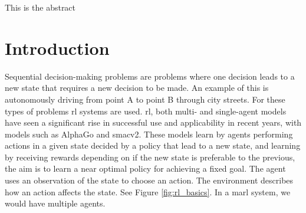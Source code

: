 \documentclass[UKenglish]{uiomasterthesis}
\begin{document}
\abstract
This is the abstract

\tableofcontents
\listoftables
\listoffigures
\chapter{Introduction}


Sequential decision-making problems are problems where one decision leads to a new state that requires a new decision to be made. An example of this is autonomously driving from point A to point B through city streets. For these types of problems \ac{rl} systems are used. \ac{rl}, both multi- and single-agent models have seen a significant rise in successful use and applicability in recent years, with models such as AlphaGo\cite{article} and smacv2\cite{ellis2023smacv2}. These models learn by agents performing actions in a given state decided by a policy that lead to a new state, and learning by receiving rewards depending on if the new state is preferable to the previous, the aim is to learn a near optimal policy for achieving a fixed goal\cite{Sutton1998}. The agent uses an observation of the state to choose an action. The environment describes how an action affects the state. See Figure \ref{fig:rl_basics}. In a \ac{marl} system, we would have multiple agents.
\end{document}
